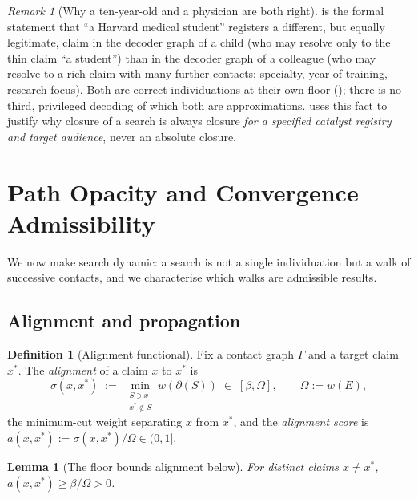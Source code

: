 \documentclass[11pt,twocolumn,a4paper]{article}
\theoremstyle{thmstyle}
\newtheorem{lemma}[theorem]{Lemma}
\theoremstyle{definition}
\newtheorem{definition}[theorem]{Definition}
\theoremstyle{remark}
\newtheorem{remark}[theorem]{Remark}
\newcommand{\Gph}{\Gamma}
\newcommand{\E}{E}
\newcommand{\wt}{w}
\newcommand{\flo}{\beta}
\newcommand{\cut}{\partial}
\newcommand{\str}{\sigma}
\begin{document}
\begin{remark}[Why a ten-year-old and a physician are both right]
\label{rem:ten-year-old}
 is the formal statement that ``a Harvard
medical student'' registers a different, but equally legitimate, claim in
the decoder graph of a child (who may resolve only to the thin claim ``a
student'') than in the decoder graph of a colleague (who may resolve to a
rich claim with many further contacts: specialty, year of training,
research focus). Both are correct individuations at their own floor
(); there is no third, privileged decoding of which both
are approximations.  uses this fact to justify why
closure of a search is always closure \emph{for a specified catalyst
registry and target audience}, never an absolute closure.
\end{remark}

\section{Path Opacity and Convergence Admissibility}
\label{sec:path}

We now make search dynamic: a search is not a single individuation but a
walk of successive contacts, and we characterise which walks are
admissible results.

\subsection{Alignment and propagation}

\begin{definition}[Alignment functional]
\label{def:alignment}
Fix a contact graph $\Gph$ and a target claim $x^{\ast}$. The
\emph{alignment} of a claim $x$ to $x^{\ast}$ is
\[
\str(x,x^{\ast})\;:=\;\min_{\substack{S\ni x\\ x^{\ast}\notin S}}
\wt(\cut(S))\;\in\;[\flo,\Omega],
\qquad \Omega:=\wt(\E),
\]
the minimum-cut weight separating $x$ from $x^{\ast}$, and the
\emph{alignment score} is $a(x,x^{\ast}):=\str(x,x^{\ast})/\Omega\in(0,1]$.
\end{definition}

\begin{lemma}[The floor bounds alignment below]
\label{lem:align-floor}
For distinct claims $x\neq x^{\ast}$, $a(x,x^{\ast})\ge\flo/\Omega>0$.
\end{lemma}
\end{document}
